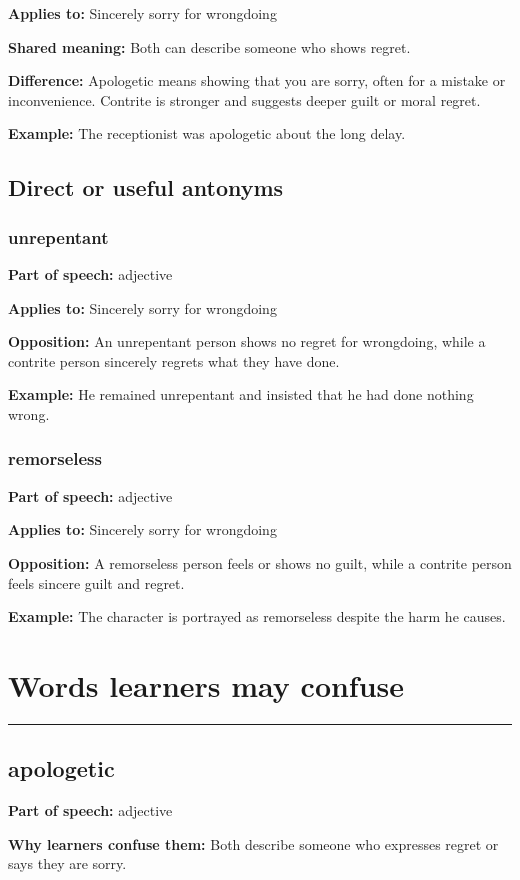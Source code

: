 \documentclass[11pt]{article}
\newcommand{\sectionrule}{\par\vspace{-0.5em}\noindent\textcolor{Accent}{\rule{\linewidth}{0.6pt}}\par}
\begin{document}
\textbf{Applies to:} Sincerely sorry for wrongdoing

\textbf{Shared meaning:} Both can describe someone who shows regret.

\textbf{Difference:} Apologetic means showing that you are sorry, often for a mistake or inconvenience. Contrite is stronger and suggests deeper guilt or moral regret.

\textbf{Example:} The receptionist was apologetic about the long delay.

\subsection{Direct or useful antonyms}
\subsubsection{unrepentant}
\textbf{Part of speech:} adjective

\textbf{Applies to:} Sincerely sorry for wrongdoing

\textbf{Opposition:} An unrepentant person shows no regret for wrongdoing, while a contrite person sincerely regrets what they have done.

\textbf{Example:} He remained unrepentant and insisted that he had done nothing wrong.

\subsubsection{remorseless}
\textbf{Part of speech:} adjective

\textbf{Applies to:} Sincerely sorry for wrongdoing

\textbf{Opposition:} A remorseless person feels or shows no guilt, while a contrite person feels sincere guilt and regret.

\textbf{Example:} The character is portrayed as remorseless despite the harm he causes.

\section{Words learners may confuse}
\sectionrule
\subsection{apologetic}
\textbf{Part of speech:} adjective

\textbf{Why learners confuse them:} Both describe someone who expresses regret or says they are sorry.
\end{document}
